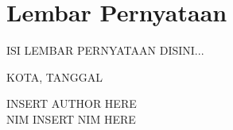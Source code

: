 \chapter*{Lembar Pernyataan}

{{ISI LEMBAR PERNYATAAN DISINI...}}

{{KOTA}}, {{TANGGAL}}

\vspace{1.75cm}

{{INSERT AUTHOR HERE}}\\
NIM {{INSERT NIM HERE}}
